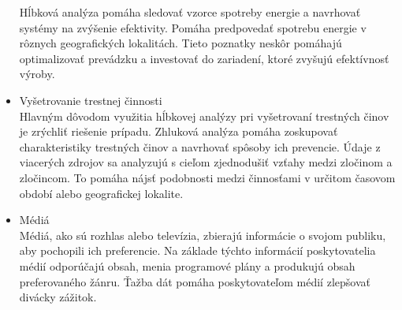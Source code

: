 \documentclass[10pt,twoside,slovak,a4paper]{article}
\begin{document}
\begin{itemize}
Hĺbková analýza pomáha sledovať vzorce spotreby energie a navrhovať systémy na zvýšenie efektivity. Pomáha predpovedať spotrebu energie v rôznych geografických lokalitách. Tieto poznatky neskôr pomáhajú optimalizovať prevádzku a investovať do zariadení, ktoré zvyšujú efektívnosť výroby.
\item Vyšetrovanie trestnej činnosti\\
Hlavným dôvodom využitia hĺbkovej analýzy pri vyšetrovaní trestných činov je zrýchliť riešenie prípadu. Zhluková analýza pomáha zoskupovať charakteristiky trestných činov a navrhovať spôsoby ich prevencie. Údaje z viacerých zdrojov sa analyzujú s cieľom zjednodušiť vzťahy medzi zločinom a zločincom. To pomáha nájsť podobnosti medzi činnosťami v určitom časovom období alebo geografickej lokalite.
\item Médiá\\
Médiá, ako sú rozhlas alebo televízia, zbierajú informácie o svojom publiku, aby pochopili ich preferencie. Na základe týchto informácií poskytovatelia médií odporúčajú obsah, menia programové plány a produkujú obsah preferovaného žánru. Ťažba dát pomáha poskytovateľom médií zlepšovať divácky zážitok.\cite{IET}
\end{itemize}
\end{document}
